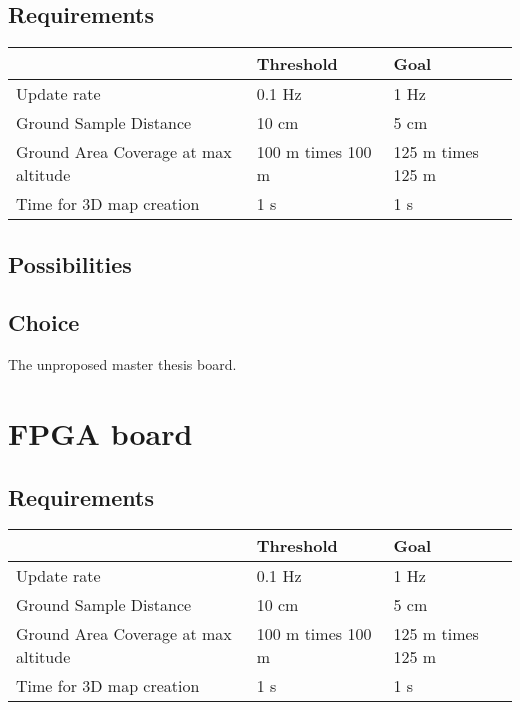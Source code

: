 \subsection{Requirements} 
\label{ssec:grid_req}

\begin{table}[H]
    \begin{tabular}{l|l|l}
    ~                                    & Threshold         & Goal              \\ \hline
    Update rate                          & 0.1 Hz            & 1 Hz              \\
    Ground Sample Distance               & 10 cm             & 5 cm              \\
    Ground Area Coverage at max altitude & 100 m times 100 m & 125 m times 125 m \\
    Time for 3D map creation             & 1 s               & 1 s               \\
    \end{tabular}
\end{table}

\subsection{Possibilities} 
\label{ssec:grid_pos}

\subsection{Choice} 
\label{ssec:grid_choice}
The unproposed master thesis board.

\section{FPGA board} 
\label{sec:fpga_board}

\subsection{Requirements} 
\label{ssec:grid_req}

\begin{table}[H]
    \begin{tabular}{l|l|l}
    ~                                    & Threshold         & Goal              \\ \hline
    Update rate                          & 0.1 Hz            & 1 Hz              \\
    Ground Sample Distance               & 10 cm             & 5 cm              \\
    Ground Area Coverage at max altitude & 100 m times 100 m & 125 m times 125 m \\
    Time for 3D map creation             & 1 s               & 1 s               \\
    \end{tabular}
\end{table}

